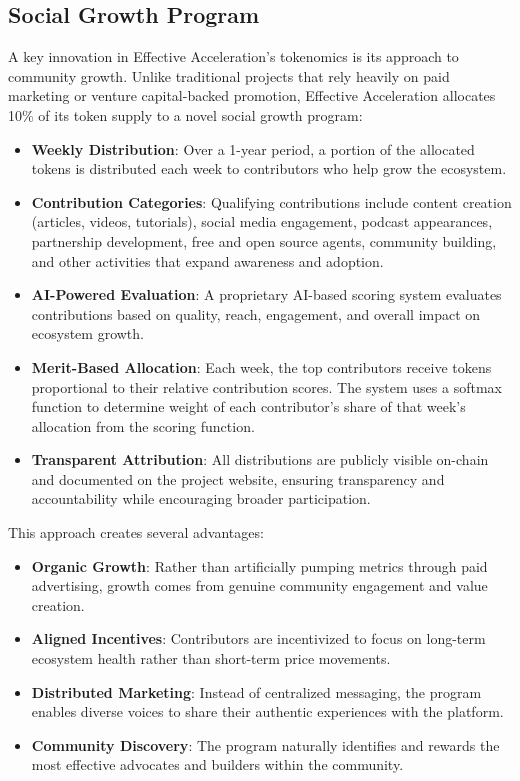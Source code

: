 \documentclass{article}
\begin{document}
\subsection{Social Growth Program}

A key innovation in Effective Acceleration's tokenomics is its approach to community growth. Unlike traditional projects that rely heavily on paid marketing or venture capital-backed promotion, Effective Acceleration allocates 10\% of its token supply to a novel social growth program:

\begin{itemize}
    \item \textbf{Weekly Distribution}: Over a 1-year period, a portion of the allocated tokens is distributed each week to contributors who help grow the ecosystem.

    \item \textbf{Contribution Categories}: Qualifying contributions include content creation (articles, videos, tutorials), social media engagement, podcast appearances, partnership development, free and open source agents, community building, and other activities that expand awareness and adoption.

    \item \textbf{AI-Powered Evaluation}: A proprietary AI-based scoring system evaluates contributions based on quality, reach, engagement, and overall impact on ecosystem growth.

    \item \textbf{Merit-Based Allocation}: Each week, the top contributors receive tokens proportional to their relative contribution scores. The system uses a softmax function to determine weight of each contributor's share of that week's allocation from the scoring function.

    \item \textbf{Transparent Attribution}: All distributions are publicly visible on-chain and documented on the project website, ensuring transparency and accountability while encouraging broader participation.
\end{itemize}

This approach creates several advantages:

\begin{itemize}
    \item \textbf{Organic Growth}: Rather than artificially pumping metrics through paid advertising, growth comes from genuine community engagement and value creation.

    \item \textbf{Aligned Incentives}: Contributors are incentivized to focus on long-term ecosystem health rather than short-term price movements.

    \item \textbf{Distributed Marketing}: Instead of centralized messaging, the program enables diverse voices to share their authentic experiences with the platform.

    \item \textbf{Community Discovery}: The program naturally identifies and rewards the most effective advocates and builders within the community.
\end{itemize}
\end{document}
